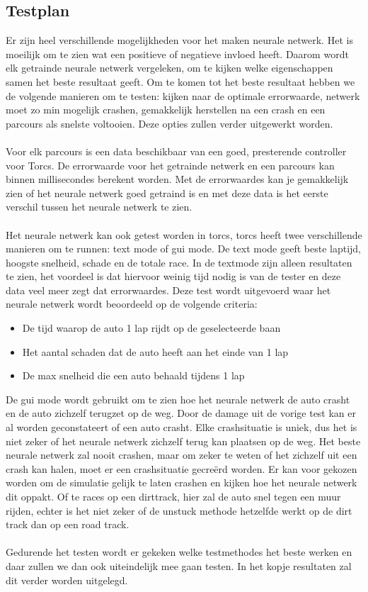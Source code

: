 \pagebreak
\subsection{Testplan}
\label{testplan}
Er zijn heel verschillende mogelijkheden voor het maken neurale netwerk. Het is moeilijk om te zien wat een positieve of negatieve invloed heeft. Daarom wordt elk getrainde neurale netwerk vergeleken, om te kijken welke eigenschappen samen het beste resultaat geeft. Om te komen tot het beste resultaat hebben we de volgende manieren om te testen: kijken naar de optimale errorwaarde, netwerk moet zo min mogelijk crashen, gemakkelijk herstellen na een crash en een parcours als snelste voltooien. Deze opties zullen verder uitgewerkt worden. \\\\
Voor elk parcours is een data beschikbaar van een goed, presterende controller voor Torcs. De errorwaarde voor het getrainde netwerk en een parcours kan binnen millisecondes berekent worden. Met de errorwaardes kan je gemakkelijk zien of het neurale netwerk goed getraind is en met deze data is het eerste verschil tussen het neurale netwerk te zien. \\\\
Het neurale netwerk kan ook getest worden in torcs, torcs heeft twee verschillende manieren om te runnen: text mode of gui mode. De text mode geeft beste laptijd, hoogste snelheid, schade en de totale race. In de textmode zijn alleen resultaten te zien, het voordeel is dat hiervoor weinig tijd nodig is van de tester en deze data veel meer zegt dat errorwaardes. Deze test wordt uitgevoerd waar het neurale netwerk wordt beoordeeld op de volgende criteria:
\begin{itemize}
\item De tijd waarop de auto 1 lap rijdt op de geselecteerde baan
\item Het aantal schaden dat de auto heeft aan het einde van 1 lap
\item De max snelheid die een auto behaald tijdens 1 lap
\end{itemize}
\noindent De gui mode wordt gebruikt om te zien hoe het neurale netwerk de auto crasht en de auto zichzelf terugzet op de weg. Door de damage uit de vorige test kan er al worden geconstateert of een auto crasht. Elke crashsituatie is uniek, dus het is niet zeker of het neurale netwerk zichzelf terug kan plaatsen op de weg. Het beste neurale netwerk zal nooit crashen, maar om zeker te weten of het zichzelf uit een crash kan halen, moet er een crashsituatie gecre\"erd worden. Er kan voor gekozen worden om de simulatie gelijk te laten crashen en kijken hoe het neurale netwerk dit oppakt. Of te races op een dirttrack, hier zal de auto snel tegen een muur rijden, echter is het niet zeker of de unstuck methode hetzelfde werkt op de dirt track dan op een road track.\\\\
Gedurende het testen wordt er gekeken welke testmethodes het beste werken en daar zullen we dan ook uiteindelijk mee gaan testen. In het kopje resultaten zal dit verder worden uitgelegd. 
